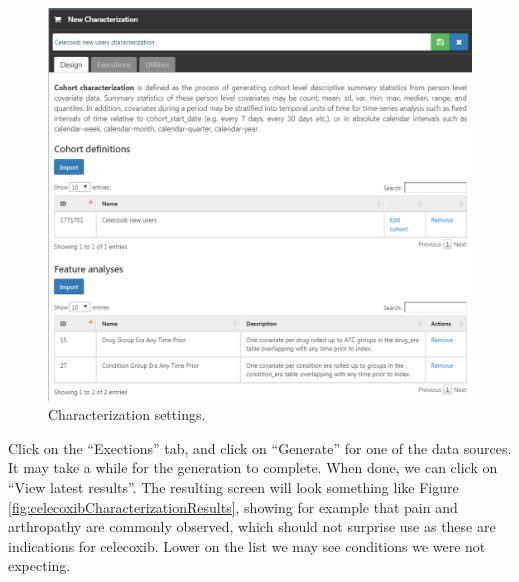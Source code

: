 \documentclass[11pt]{book}
\theoremstyle{definition}
\theoremstyle{definition}
\theoremstyle{definition}
\theoremstyle{remark}
\begin{document}
\begin{figure}

{\centering \includegraphics[width=1\linewidth]{images/SuggestedAnswers/celecoxibCharacterization} 

}

\caption{Characterization settings.}\label{fig:celecoxibCharacterization}
\end{figure}

Click on the ``Exections'' tab, and click on ``Generate'' for one of the
data sources. It may take a while for the generation to complete. When
done, we can click on ``View latest results''. The resulting screen will
look something like Figure \ref{fig:celecoxibCharacterizationResults},
showing for example that pain and arthropathy are commonly observed,
which should not surprise use as these are indications for celecoxib.
Lower on the list we may see conditions we were not expecting.
\end{document}
